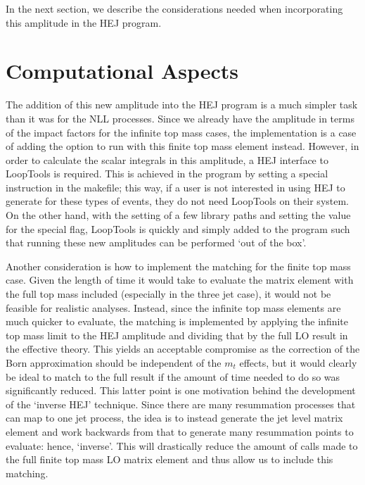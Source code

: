 In the next section, we describe the considerations needed when incorporating this amplitude in the HEJ program. 

\section{Computational Aspects}

The addition of this new amplitude into the HEJ program is a much simpler task than it was for the NLL processes. Since we already have the amplitude in terms of the impact factors for the infinite top mass cases, the implementation is a case of adding the option to run with this finite top mass element instead. However, in order to calculate the scalar integrals in this amplitude, a HEJ interface to LoopTools is required. This is achieved in the program by setting a special instruction in the makefile; this way, if a user is not interested in using HEJ to generate for these types of events, they do not need LoopTools on their system. On the other hand, with the setting of a few library paths and setting the value for the special flag, LoopTools is quickly and simply added to the program such that running these new amplitudes can be performed `out of the box'. 

Another consideration is how to implement the matching for the finite top mass case. Given the length of time it would take to evaluate the matrix element with the full top mass included (especially in the three jet case), it would not be feasible for realistic analyses. Instead, since the infinite top mass elements are much quicker to evaluate, the matching is implemented by applying the infinite top mass limit to the HEJ amplitude and dividing that by the full LO result in the effective theory. This yields an acceptable compromise as the correction of the Born approximation should be independent of the $m_t$ effects, but it would clearly be ideal to match to the full result if the amount of time needed to do so was significantly reduced. This latter point is one motivation behind the development of the `inverse HEJ' technique. Since there are many resummation processes that can map to one jet process, the idea is to instead generate the jet level matrix element and work backwards from that to generate many resummation points to evaluate: hence, `inverse'. This will drastically reduce the amount of calls made to the full finite top mass LO matrix element and thus allow us to include this matching. 

